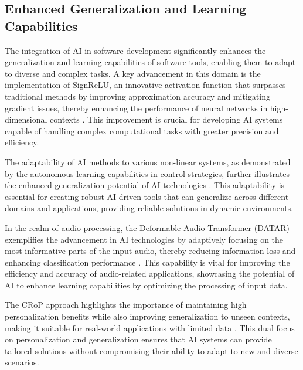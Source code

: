 \subsection{Enhanced Generalization and Learning Capabilities} \label{subsec:Enhanced Generalization and Learning Capabilities}

The integration of AI in software development significantly enhances the generalization and learning capabilities of software tools, enabling them to adapt to diverse and complex tasks. A key advancement in this domain is the implementation of SignReLU, an innovative activation function that surpasses traditional methods by improving approximation accuracy and mitigating gradient issues, thereby enhancing the performance of neural networks in high-dimensional contexts \cite{li2023signreluneuralnetworkapproximation}. This improvement is crucial for developing AI systems capable of handling complex computational tasks with greater precision and efficiency.



The adaptability of AI methods to various non-linear systems, as demonstrated by the autonomous learning capabilities in control strategies, further illustrates the enhanced generalization potential of AI technologies \cite{vashishtha2019restoringchaosusingdeep}. This adaptability is essential for creating robust AI-driven tools that can generalize across different domains and applications, providing reliable solutions in dynamic environments.



In the realm of audio processing, the Deformable Audio Transformer (DATAR) exemplifies the advancement in AI technologies by adaptively focusing on the most informative parts of the input audio, thereby reducing information loss and enhancing classification performance \cite{zhu2024deformableaudiotransformeraudio}. This capability is vital for improving the efficiency and accuracy of audio-related applications, showcasing the potential of AI to enhance learning capabilities by optimizing the processing of input data.



The CRoP approach highlights the importance of maintaining high personalization benefits while also improving generalization to unseen contexts, making it suitable for real-world applications with limited data \cite{kaur2024cropcontextwiserobuststatic}. This dual focus on personalization and generalization ensures that AI systems can provide tailored solutions without compromising their ability to adapt to new and diverse scenarios.




